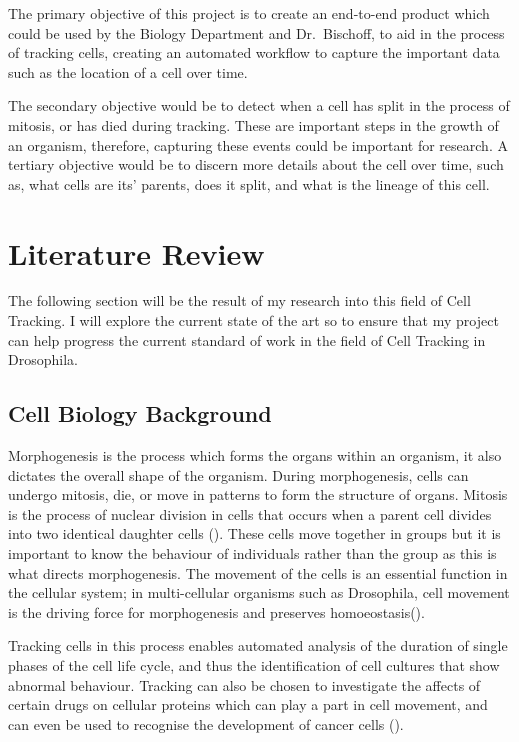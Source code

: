\documentclass[12pt a4paper]{article}
\begin{document}
The primary objective of this project is to create an end-to-end product which could be used by the Biology Department and Dr.~Bischoff, to aid in the process of tracking cells, creating an automated workflow to capture the important data such as the location of a cell over time.

The secondary objective would be to detect when a cell has split in the process of mitosis, or has died during tracking. These are important steps in the growth of an organism, therefore, capturing these events could be important for research.
A tertiary objective would be to discern more details about the cell over time, such as, what cells are its' parents, does it split, and what is the lineage of this cell.

\newpage
\section{Literature Review}
The following section will be the result of my research into this field of Cell Tracking. I will explore the current state of the art so to ensure that my project can help progress the current standard of work in the field of Cell Tracking in Drosophila.
    \subsection{Cell Biology Background}
Morphogenesis is the process which forms the organs within an organism, it also dictates the overall shape of the organism. 
During morphogenesis, cells can undergo mitosis, die, or move in patterns to form the structure of organs. Mitosis is the process of nuclear division in cells that occurs when a parent cell divides into two identical daughter cells (\cite{mitosis}). These cells move together in groups but it is important to know the behaviour of individuals rather than the group as this is what directs morphogenesis. The movement of the cells is an essential function in the cellular system; in multi-cellular organisms such as Drosophila, cell movement is the driving force for morphogenesis and preserves homoeostasis(\cite{miura_2005}).

Tracking cells in this process enables automated analysis of the duration of single phases of the cell life cycle, and thus the identification of cell cultures that show abnormal behaviour. Tracking can also be chosen to investigate the affects of certain drugs on cellular proteins which can play a part in cell movement, and can even be used to recognise the development of cancer cells (\cite{harder_mora-bermúdez_godinez_ellenberg_eils_rohr_2006}).
\end{document}
